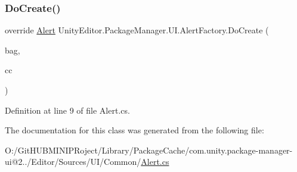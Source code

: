 \subsubsection{\texorpdfstring{DoCreate()}{DoCreate()}}
{\footnotesize\ttfamily override \mbox{\hyperlink{class_unity_editor_1_1_package_manager_1_1_u_i_1_1_alert}{Alert}} Unity\+Editor.\+Package\+Manager.\+U\+I.\+Alert\+Factory.\+Do\+Create (\begin{DoxyParamCaption}\item[{I\+Uxml\+Attributes}]{bag,  }\item[{Creation\+Context}]{cc }\end{DoxyParamCaption})\hspace{0.3cm}{\ttfamily [protected]}}



Definition at line 9 of file Alert.\+cs.



The documentation for this class was generated from the following file\+:\begin{DoxyCompactItemize}
\item 
O\+:/\+Git\+H\+U\+B\+M\+I\+N\+I\+P\+Roject/\+Library/\+Package\+Cache/com.\+unity.\+package-\/manager-\/ui@2../\+Editor/\+Sources/\+U\+I/\+Common/\mbox{\hyperlink{_alert_8cs}{Alert.\+cs}}\end{DoxyCompactItemize}
